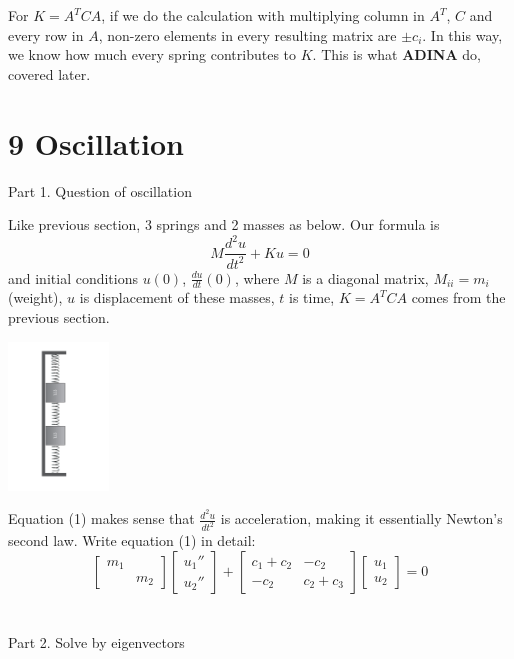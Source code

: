 \documentclass{article}
\begin{document}
\begin{spacing}{1.5}
For  $K=A^TCA$, if we do the calculation with multiplying column in $A^T$, $C$ and every row in $A$, non-zero elements in every resulting matrix are $\pm c_i$. In this way, we know how much every spring contributes to $K$. This is what {\bfseries ADINA} do, covered later.


\section*{9 Oscillation}
Part 1. Question of oscillation

Like previous section, 3 springs and 2 masses as below. Our formula is
\begin{equation}
	M\frac{d^2u}{dt^2}+Ku=0
\end{equation} and initial conditions $u(0)$, $\frac{du}{dt}(0)$, where $M$ is a diagonal matrix, $M_{ii}=m_i$(weight), $u$ is displacement of these masses, $t$ is time, $K=A^TCA$ comes from the previous section. 
\\\begin{center}
	\includegraphics[width=0.2\textwidth]{three_springs_two_masses.png} \\ 
\end{center}

Equation (1) makes sense that $\frac{d^2u}{dt^2}$ is acceleration, making it essentially Newton's second law. Write equation (1) in detail:
$$
\begin{bmatrix}
m_1 & \\
    & m_2
\end{bmatrix}
\begin{bmatrix}
u_1'' \\
u_2''
\end{bmatrix}
+
\begin{bmatrix}
c_1+c_2 &-c_2\\
-c_2 & c_2+c_3
\end{bmatrix}
\begin{bmatrix}
u_1 \\
u_2
\end{bmatrix}
=0
$$
\\\\Part 2. Solve by eigenvectors


\end{spacing}
\end{document}
